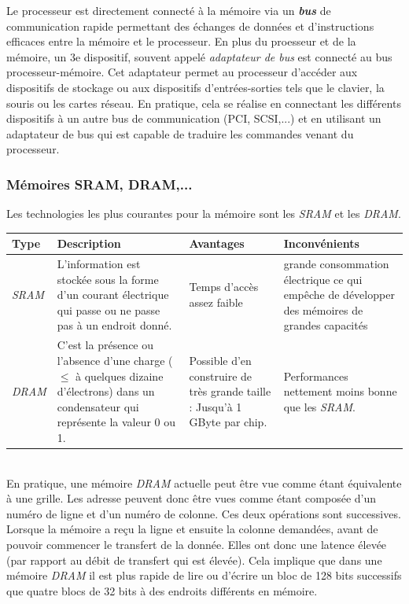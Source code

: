 Le processeur est directement connecté à la mémoire via un \textbf{\textit{bus}} de communication rapide permettant des échanges de données et d'instructions efficaces entre la mémoire et le processeur.
En plus du proesseur et de la mémoire, un 3e dispositif, souvent appelé \textit{adaptateur de bus} est connecté au bus processeur-mémoire.
Cet adaptateur permet au processeur d'accéder aux dispositifs de stockage ou aux dispositifs d'entrées-sorties tels que le clavier, la souris ou les cartes réseau.
En pratique, cela se réalise en connectant les différents dispositifs à un autre bus de communication (PCI, SCSI,...) et en utilisant un adaptateur de bus qui est capable de traduire les commandes venant du processeur.

\subsubsection*{Mémoires SRAM, DRAM,...}
Les technologies les plus courantes pour la mémoire sont les \textit{SRAM} et les \textit{DRAM}.\\

\noindent\begin{tabularx}{\textwidth}{|l|p{}|p{}|p{}|}
  \hline
  \textbf{Type} & \textbf{Description} & \textbf{Avantages} & \textbf{Inconvénients} \\
  \hline \hline
  \textit{SRAM} & L'information est stockée sous la forme d'un courant électrique qui passe ou ne passe pas à un endroit donné.
  & Temps d'accès assez faible & grande consommation électrique ce qui empêche de développer des mémoires de grandes capacités \\
  \hline
  \textit{DRAM} & C'est la présence ou l'absence d'une charge ($\leq$ à quelques dizaine d'électrons) dans un condensateur qui représente la valeur 0 ou 1.
  & Possible d'en construire de très grande taille : Jusqu'à 1 GByte par chip.
  & Performances nettement moins bonne que les \textit{SRAM}. \\
  \hline
\end{tabularx}
~\\

En pratique, une mémoire \textit{DRAM} actuelle peut être vue comme étant équivalente à une grille.
Les adresse peuvent donc être vues comme étant composée d'un numéro de ligne et d'un numéro de colonne.
Ces deux opérations sont successives.
Lorsque la mémoire a reçu la ligne et ensuite la colonne demandées, avant de pouvoir commencer le transfert de la donnée.
Elles ont donc une latence élevée (par rapport au débit de transfert qui est élevée).
Cela implique que dans une mémoire \textit{DRAM} il est plus rapide de lire ou d'écrire un bloc de 128 bits successifs que quatre blocs de 32 bits à des endroits différents en mémoire.


